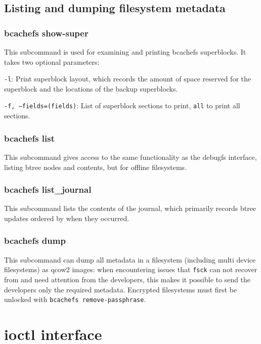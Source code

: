 \documentclass{article}
\begin{document}
\subsection{Listing and dumping filesystem metadata}

\subsubsection{bcachefs show-super}

This subcommand is used for examining and printing bcachefs superblocks. It
takes two optional parameters:
\begin{description}
	\item \texttt{-l}: Print superblock layout, which records the amount of
		space reserved for the superblock and the locations of the
		backup superblocks.
	\item \texttt{-f, --fields=(fields)}: List of superblock sections to
		print, \texttt{all} to print all sections.
\end{description}

\subsubsection{bcachefs list}

This subcommand gives access to the same functionality as the debugfs interface,
listing btree nodes and contents, but for offline filesystems.

\subsubsection{bcachefs list\_journal}

This subcommand lists the contents of the journal, which primarily records btree
updates ordered by when they occurred.

\subsubsection{bcachefs dump}

This subcommand can dump all metadata in a filesystem (including multi device
filesystems) as qcow2 images: when encountering issues that \texttt{fsck} can
not recover from and need attention from the developers, this makes it possible
to send the developers only the required metadata. Encrypted filesystems must
first be unlocked with \texttt{bcachefs remove-passphrase}.

\section{ioctl interface}
\end{document}
